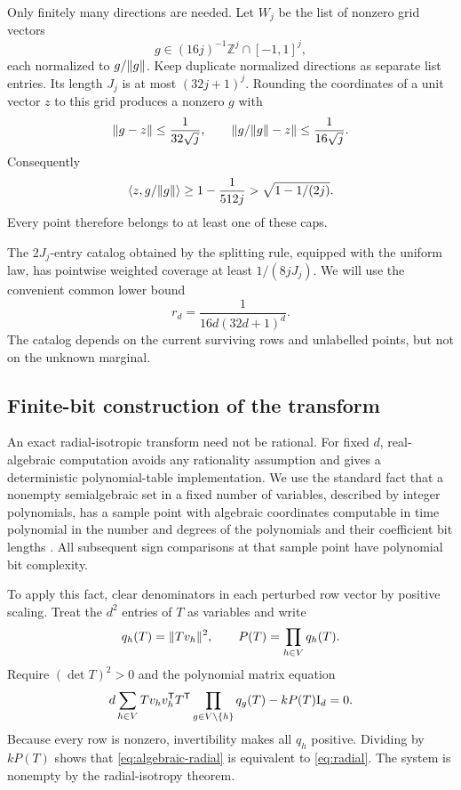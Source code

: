 Only finitely many directions are needed. Let $W_j$ be the list of nonzero grid vectors
\[
 g\in(16j)^{-1}\mathbb Z^j\cap[-1,1]^j,
\]
each normalized to $g/\lVert g\rVert$. Keep duplicate normalized directions as separate list entries. Its length $J_j$ is at most $(32j+1)^j$. Rounding the coordinates of a unit vector $z$ to this grid produces a nonzero $g$ with
\[
 \lVert g-z\rVert\le\frac1{32\sqrt j},\qquad
 \lVert g/\lVert g\rVert-z\rVert\le\frac1{16\sqrt j}.
\]
Consequently
\[
 \langle z,g/\lVert g\rVert\rangle\ge1-\frac1{512j}
 >\sqrt{1-1/(2j)}.
\]
Every point therefore belongs to at least one of these caps.

The $2J_j$-entry catalog obtained by the splitting rule, equipped with the uniform law, has pointwise weighted coverage at least $1/(8jJ_j)$. We will use the convenient common lower bound
\begin{equation}
 r_d=\frac1{16d(32d+1)^d}.
\label{eq:catalogr}
\end{equation}
The catalog depends on the current surviving rows and unlabelled points, but not on the unknown marginal.

\subsection{Finite-bit construction of the transform}
An exact radial-isotropic transform need not be rational. For fixed $d$, real-algebraic computation avoids any rationality assumption and gives a deterministic polynomial-table implementation. We use the standard fact that a nonempty semialgebraic set in a fixed number of variables, described by integer polynomials, has a sample point with algebraic coordinates computable in time polynomial in the number and degrees of the polynomials and their coefficient bit lengths \citep{BPR06}. All subsequent sign comparisons at that sample point have polynomial bit complexity.

To apply this fact, clear denominators in each perturbed row vector by positive scaling. Treat the $d^2$ entries of $T$ as variables and write
\[
 q_h(T)=\lVert Tv_h\rVert^2,\qquad P(T)=\prod_{h\in V}q_h(T).
\]
Require $(\det T)^2>0$ and the polynomial matrix equation
\begin{equation}
 d\sum_{h\in V}Tv_hv_h^{\mathsf T}T^{\mathsf T}
       \prod_{g\in V\setminus\{h\}}q_g(T)
       -kP(T)\mathrm I_d=0.
\label{eq:algebraic-radial}
\end{equation}
Because every row is nonzero, invertibility makes all $q_h$ positive. Dividing by $kP(T)$ shows that \eqref{eq:algebraic-radial} is equivalent to \eqref{eq:radial}. The system is nonempty by the radial-isotropy theorem.

